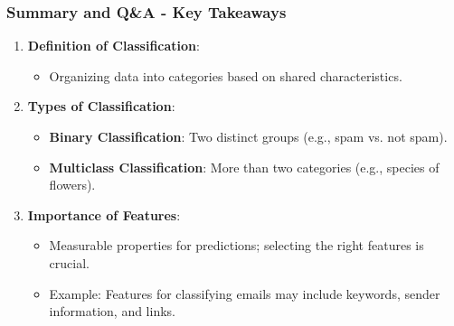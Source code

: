 \documentclass[aspectratio=169]{beamer}
\begin{document}
\begin{frame}[fragile]
    \frametitle{Summary and Q\&A - Key Takeaways}
    \begin{enumerate}
        \item \textbf{Definition of Classification}:
        \begin{itemize}
            \item Organizing data into categories based on shared characteristics.
        \end{itemize}
        
        \item \textbf{Types of Classification}:
        \begin{itemize}
            \item \textbf{Binary Classification}: Two distinct groups (e.g., spam vs. not spam).
            \item \textbf{Multiclass Classification}: More than two categories (e.g., species of flowers).
        \end{itemize}
        
        \item \textbf{Importance of Features}:
        \begin{itemize}
            \item Measurable properties for predictions; selecting the right features is crucial.
            \item Example: Features for classifying emails may include keywords, sender information, and links.
        \end{itemize}
    \end{enumerate}
\end{frame}
\end{document}
